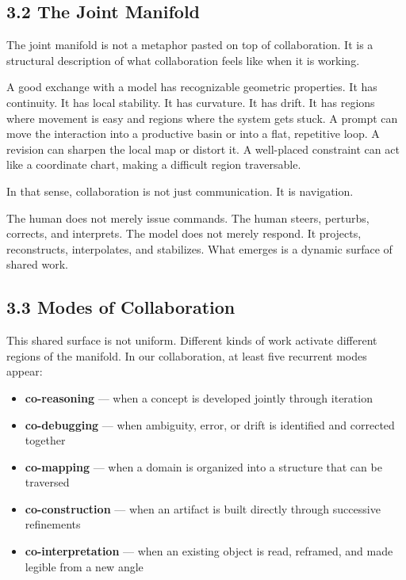 \hypertarget{the-joint-manifold}{%
\subsection{3.2 The Joint Manifold}\label{the-joint-manifold}}

The joint manifold is not a metaphor pasted on top of collaboration. It
is a structural description of what collaboration feels like when it is
working.

A good exchange with a model has recognizable geometric properties. It
has continuity. It has local stability. It has curvature. It has drift.
It has regions where movement is easy and regions where the system gets
stuck. A prompt can move the interaction into a productive basin or into
a flat, repetitive loop. A revision can sharpen the local map or distort
it. A well-placed constraint can act like a coordinate chart, making a
difficult region traversable.

In that sense, collaboration is not just communication. It is
navigation.

The human does not merely issue commands. The human steers, perturbs,
corrects, and interprets. The model does not merely respond. It
projects, reconstructs, interpolates, and stabilizes. What emerges is a
dynamic surface of shared work.

\hypertarget{modes-of-collaboration}{%
\subsection{3.3 Modes of Collaboration}\label{modes-of-collaboration}}

This shared surface is not uniform. Different kinds of work activate
different regions of the manifold. In our collaboration, at least five
recurrent modes appear:

\begin{itemize}
\tightlist
\item
  \textbf{co-reasoning} --- when a concept is developed jointly through
  iteration
\item
  \textbf{co-debugging} --- when ambiguity, error, or drift is
  identified and corrected together
\item
  \textbf{co-mapping} --- when a domain is organized into a structure
  that can be traversed
\item
  \textbf{co-construction} --- when an artifact is built directly
  through successive refinements
\item
  \textbf{co-interpretation} --- when an existing object is read,
  reframed, and made legible from a new angle
\end{itemize}

